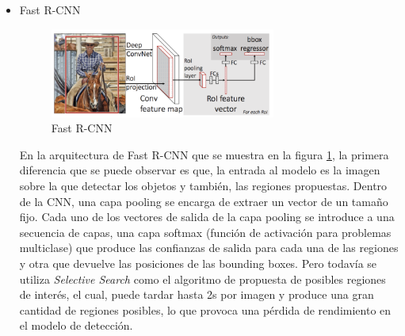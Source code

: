 \begin{itemize}
    \item Fast R-CNN \\
    \begin{figure}[H]
        \centering
        \includegraphics[width=0.70\textwidth]{Imagenes/GeoAI/FastRCNN.png}
        \caption{Fast R-CNN} \label{fig:FastRCNN}
    \end{figure}
    En la arquitectura de Fast R-CNN que se muestra en la figura \ref{fig:FastRCNN}, la primera diferencia que se puede observar es que,
    la entrada al modelo es la imagen sobre la que detectar los objetos y también, las regiones propuestas.
    Dentro de la CNN, una capa pooling se encarga de extraer un vector de un tamaño fijo. 
    Cada uno de los vectores de salida de la capa pooling se introduce a una secuencia de capas, una capa softmax (función de activación para problemas multiclase) 
    que produce las confianzas de salida para cada una de las regiones y otra que devuelve las posiciones de las bounding boxes.
    Pero todavía se utiliza \textit{Selective Search} como el algoritmo de propuesta de posibles regiones de interés, el cual, puede tardar hasta 2s por imagen y produce
    una gran cantidad de regiones posibles, lo que provoca una pérdida de rendimiento en el modelo de detección.


\end{itemize}
